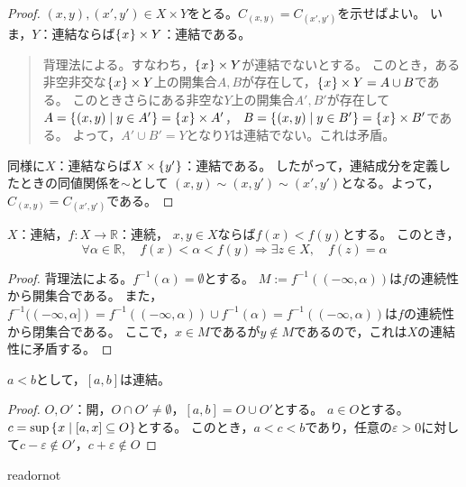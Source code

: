 \documentclass[uplatex]{jsarticle}
\begin{document}
\begin{proof}
  $(x,y), (x', y') \in X \times Y$をとる。$C_{(x,y)} = C_{(x',y')}$を示せばよい。
  いま，$Y$：連結ならば$\Set{\hspace{-1.8pt} x \hspace{-1.8pt}} \times Y$：連結である。
  \begin{quote}
    背理法による。すなわち，$\Set{\hspace{-1.8pt} x \hspace{-1.8pt}} \times Y$が連結でないとする。
    このとき，ある非空非交な$\Set{\hspace{-1.8pt} x \hspace{-1.8pt}} \times Y$上の開集合$A,B$が存在して，$\Set{\hspace{-1.8pt} x \hspace{-1.8pt}} \times Y = A \cup B$である。
    このときさらにある非空な$Y$上の開集合$A',B'$が存在して
    $A = \Set{\hspace{-1.8pt} (x,y) | y \in A' \hspace{-1.8pt}} = \Set{\hspace{-1.8pt} x \hspace{-1.8pt}} \times A'$，
    $B = \Set{\hspace{-1.8pt} (x,y) | y \in B' \hspace{-1.8pt}} = \Set{\hspace{-1.8pt} x \hspace{-1.8pt}} \times B'$である。
    よって，$A' \cup B' = Y$となり$Y$は連結でない。これは矛盾。
  \end{quote}
  同様に$X$：連結ならば$X \times \Set{\hspace{-1.8pt} y' \hspace{-1.8pt}}$：連結である。
  したがって，連結成分を定義したときの同値関係を$\sim$として
  $(x,y) \sim (x, y') \sim (x',y')$となる。よって，$C_{(x,y)} = C_{(x',y')}$である。
\end{proof}

\begin{prop}[中間値の定理]
  $X$：連結，$f \colon X \longrightarrow \mathbb{R}$：連続，
  $x,y \in X$ならば$f(x) < f(y)$とする。
  このとき，
  \begin{equation}
    \forall \alpha \in \mathbb{R}, \quad f(x) < \alpha < f(y) \Longrightarrow \exists z \in X, \quad f(z) = \alpha
  \end{equation}
\end{prop}

\begin{proof}
  背理法による。$f^{-1} (\alpha) = \emptyset$とする。
  $M := f^{-1}((- \infty, \alpha))$は$f$の連続性から開集合である。
  また，$f^{-1}((- \infty, \alpha]) = f^{-1}((- \infty, \alpha)) \cup f^{-1}(\alpha) = f^{-1}((- \infty, \alpha))$は$f$の連続性から閉集合である。
  ここで，$x \in M$であるが$y \notin M$であるので，これは$X$の連結性に矛盾する。
\end{proof}

\begin{hodai}
  $a<b$として，$\left[ a,b \right]$は連結。
\end{hodai}

\begin{proof}
  $O, O'$：開，$O \cap O' \neq \emptyset$，$\left[ a,b \right] = O \cup O'$とする。
  $a \in O$とする。$c = \sup \Set{\hspace{-1.8pt} x| \left[ a, x \right] \subseteq O \hspace{-1.8pt}}$とする。
  このとき，$a < c < b$であり，任意の$\varepsilon > 0$に対して$c - \varepsilon \notin O'$，$c + \varepsilon \notin O$
\end{proof}

\expandafter\ifx\csname readornot\endcsname\relax
  
\end{document}
